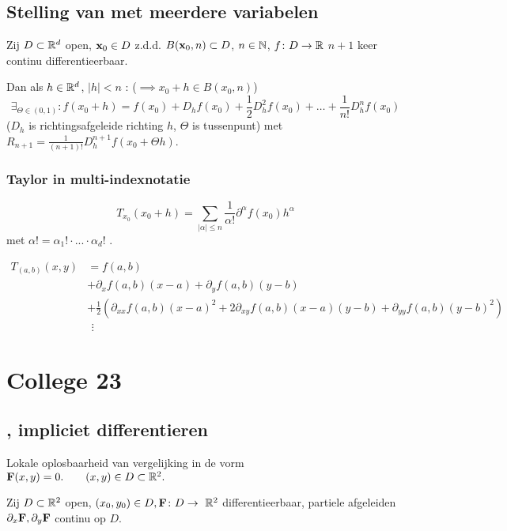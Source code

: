 \documentclass{2wa40summary}
\begin{document}
		\subsection{Stelling van  met meerdere variabelen}
			\theorem Zij  $D \subset \mathbb{R}^d$ open, ${\textbf{x}}_0 \in D$ z.d.d. $B({\textbf{x}}_0,n) \subset D$, $n\in \mathbb{N}$, $f\colon D\to \mathbb{R}$ $n+1$ keer continu differentieerbaar.
			
			Dan als $h \in \mathbb{R}^d$, $ |h|<n $ : ($\implies x_0+h \in B(x_0,n)$)
			\[ \exists_{\Theta \in (0,1)}:f(x_0+h) = f(x_0) + D_h f(x_0) + \frac{1}{2} D_h^2 f(x_0) + \dots + \frac{1}{n!} D_h^n f(x_0) \]
			($D_h$ is richtingsafgeleide richting $h$, $\Theta$ is tussenpunt)
			met $R_{n+1} = \frac{1}{(n+1)!}D_h^{n+1} f(x_0 + \Theta h)$.
		
			\subsubsection{Taylor in multi-indexnotatie}
				\[ T_{x_0} (x_0 + h) = \sum_{|\alpha|\le n} \frac{1}{\alpha !} \partial^\alpha f(x_0)h^\alpha \] met $ \alpha ! = \alpha_1 ! \cdot ... \cdot \alpha_d !$ .
				
			\begin{voorbeeld}
				\begin{align*}
					T_{(a,b)} (x,y) &= f(a,b) \\
					&+ \partial_x f(a,b) (x-a) + \partial_y f(a,b) (y-b) \\
					&+ \frac{1}{2} (\partial_{xx} f(a,b) (x-a)^2 + 2 \partial_{xy} f(a,b) (x-a)(y-b) + \partial_{yy} f(a,b)(y-b)^2 ) \\
					& \ \, \vdots 
				\end{align*}
			\end{voorbeeld}
		
	\newpage
	\section{College 23}
		\subsection{, impliciet differentieren}
			Lokale oplosbaarheid van vergelijking in de vorm $ {\textbf{F}}(x,y)=0. \qquad (x,y) \in D \subset \mathbb{R}^2. $
			
			 Zij $D \subset \mathbb{R}^2$ open, $ (x_0 , y_0 ) \in D, {\textbf{F}}\colon D \to~\mathbb{R}^2 $ differentieerbaar, partiele afgeleiden $ \partial_x {\textbf{F}}, \partial_y {\textbf{F}} $ continu op $ D $.
			
\end{document}
